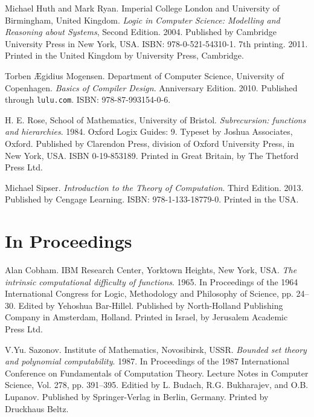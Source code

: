 \begin{thebibliography}{9}
Michael Huth and Mark Ryan. Imperial College London and University of
Birmingham, United Kingdom. \emph{Logic in Computer Science: Modelling and
Reasoning about Systems}, Second Edition. 2004. Published by Cambridge
University Press in New York, USA. ISBN: 978-0-521-54310-1. 7th printing. 2011.
Printed in the United Kingdom by University Press, Cambridge.

\backrefprint


Torben Ægidius Mogensen. Department of Computer Science, University of
Copenhagen. \emph{Basics of Compiler Design}. Anniversary Edition. 2010.
Published through \texttt{lulu.com}. ISBN: 978-87-993154-0-6.

\backrefprint


H. E. Rose, School of Mathematics, University of Bristol. \emph{Subrecursion:
functions and hierarchies}. 1984. Oxford Logix Guides: 9. Typeset by Joshua
Associates, Oxford.  Published by Clarendon Press, division of Oxford
University Press, in New York, USA. ISBN 0-19-853189. Printed in Great Britain,
by The Thetford Press Ltd.

\backrefprint


Michael Sipser. \emph{Introduction to the Theory of Computation}. Third
Edition. 2013. Published by Cengage Learning. ISBN: 978-1-133-18779-0. Printed
in the USA.

\backrefprint

\section*{In Proceedings}


Alan Cobham. IBM Research Center, Yorktown Heights, New York, USA. \emph{The
intrinsic computational difficulty of functions}. 1965. In Proceedings of the
1964 International Congress for Logic, Methodology and Philosophy of Science,
pp. 24--30. Edited by Yehoshua Bar-Hillel. Published by North-Holland
Publishing Company in Amsterdam, Holland.  Printed in Israel, by Jerusalem
Academic Press Ltd.

\backrefprint


V.Yu. Sazonov. Institute of Mathematics, Novosibirsk, USSR. \emph{Bounded set
theory and polynomial computability}. 1987. In Proceedings of the 1987
International Conference on Fundamentals of Computation Theory. Lecture Notes
in Computer Science, Vol. 278, pp. 391--395. Editied by L. Budach, R.G.
Bukharajev, and O.B. Lupanov. Published by Springer-Verlag in Berlin, Germany.
Printed by Druckhaus Beltz.


\end{thebibliography}
